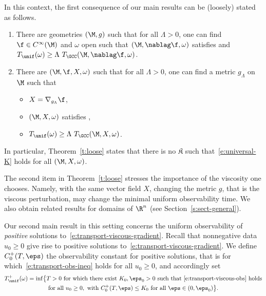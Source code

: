 In this context, the first consequence of our main results can be (loosely) stated as follows.

\skpt
\begin{theorem}
\label{t:loose}
\begin{enumerate}
\item There are geometries $(\M,g)$ such that for all $\Lambda>0$, one can find $\f \in C^\infty(\M)$ and $\omega$ open such that $(\M, \nablag \f, \omega)$ satisfies \pGCC and $T_{\unif}(\omega) \geq \Lambda \ T_{\GCC}(\M, \nablag \f, \omega)$.
\item There are $(\M,\f, X,\omega)$ such that for all $\Lambda>0$, one can find a metric $g_\Lambda$ on $\M$ such that
\begin{itemize}
\item $X = \nabla_{g_\Lambda}\f$,
\item $(\M, X, \omega)$ satisfies \pGCC,
\item $T_{\unif}(\omega) \geq \Lambda \ T_{\GCC}(\M, X, \omega)$.
\end{itemize}
\end{enumerate}
\end{theorem}
In particular, Theorem~\ref{t:loose} states that there is no $\mathfrak{K}$ such that~\eqref{e:universal-K} holds for all $(\M,X,\omega)$.

The second item in Theorem~\ref{t:loose} stresses the importance of the viscosity one chooses. Namely, with the same vector field $X$, changing the metric $g$, that is the viscous perturbation, may change the minimal uniform observability time.
We also obtain related results for domains of $\R^{n}$ (see Section~\ref{s:sect-general}).

Our second main result in this setting concerns the uniform observability of {\em positive} solutions to~\eqref{e:transport-viscous-gradient}. Recall that nonnegative data $u_0\geq 0$ give rise to positive solutions to~\eqref{e:transport-viscous-gradient}. We define $C_0^+(T,\eps)$ the observability constant for positive solutions, that is for which~\eqref{e:transport-obs-ineq} holds for all $u_0\geq0$, and accordingly set
\begin{multline}
\label{defTunif+}
T_{\unif}^+(\omega) = \inf \bigl\{ T >0 \text{ for which there exist }K_0, \eps_0>0 \text{ such that~\eqref{e:transport-viscous-obs} holds}\\
\text{for all }u_0\geq 0, \text{ with }C_0^+(T,\eps)\leq K_0 \text{ for all } \eps \in (0,\eps_0) \bigr\}.
\end{multline}

